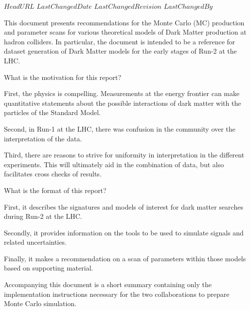 \svnidlong
{$HeadURL$}
{$LastChangedDate$}
{$LastChangedRevision$}
{$LastChangedBy$}
\pagestyle{fancy}
\fancyhead{}
\fancyhead[ol]{\svnrev;\svndate;\svnauthor}

This document presents recommendations for
the Monte Carlo (MC) production and parameter scans
for various theoretical models of Dark Matter production
at hadron colliders.  In particular, the document is
intended to be a reference for dataset generation of
Dark Matter models for the early stages of Run-2 at the LHC.

What is the motivation for this report?

First, the physics is compelling. Measurements at the energy frontier
can make quantitative statements about the possible interactions of
dark matter with the particles of the Standard Model.

Second, in Run-1 at the LHC, there was confusion in the community
over the interpretation of the data.

Third, there are reasons to strive for uniformity in interpretation
in the different experiments.  This will ultimately aid in the
combination of data, but also facilitates cross checks of results.

What is the format of this report?

First, it describes the signatures and models of interest for
dark matter searches during Run-2 at the LHC.

Secondly, it provides information on the tools to be used to
simulate signals and related uncertainties.

Finally, it makes a recommendation on a scan of parameters within
those models based on supporting material.

Accompanying this document is a short summary containing only the
implementation instructions necessary for the two collaborations to
prepare Monte Carlo simulation.